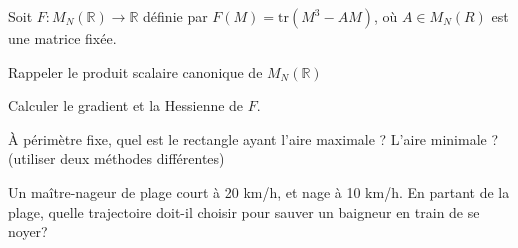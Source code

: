 \documentclass[12pt,a4paper,fleqn]{report}
\newcommand{\R}{\mathbb R}
\begin{document}
\begin{exercice}
  Soit $F : M_{N}(\R) \to \R$ définie par $F(M) = \text{tr}(M^{3} - A
  M)$, où $A \in M_{N}(R)$ est une matrice fixée.
  \begin{questions}
  \item Rappeler le produit scalaire canonique de $M_{N}(\R)$
  \item Calculer le gradient et la Hessienne de $F$.
  \end{questions}
\end{exercice}

\begin{exercice}
  À périmètre fixe, quel est le rectangle ayant l'aire maximale ?
  L'aire minimale ? (utiliser deux méthodes différentes)
\end{exercice}

\begin{exercice}
  Un maître-nageur de plage court à 20 km/h, et nage à 10 km/h. En
  partant de la plage, quelle trajectoire doit-il choisir pour sauver
  un baigneur en train de se noyer?
\end{exercice}
\end{document}
